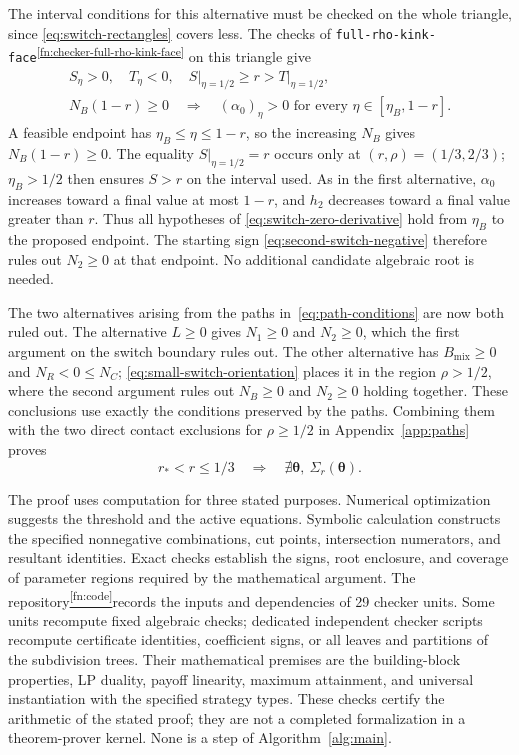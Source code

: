 \documentclass[11pt]{article}
\theoremstyle{remark}
\theoremstyle{plain}
\newcommand{\codefootref}{\hyperref[fn:code]{\textsuperscript{\ref*{fn:code}}}}
\begin{document}
The interval conditions for this alternative must be checked on
the whole triangle, since \eqref{eq:switch-rectangles} covers less.
The checks of \nolinkurl{full-rho-kink-face}\textsuperscript{\ref{fn:checker-full-rho-kink-face}} on this triangle give
\begin{equation}
 \begin{gathered}
 S_\eta>0,\quad T_\eta<0,\quad \left.S\right|_{\eta=1/2}\ge r>\left.T\right|_{\eta=1/2},\\
 N_B(1-r)\ge0\quad\Longrightarrow\quad
 (\alpha_0)_\eta>0\text{ for every }\eta\in[\eta_B,1-r].
 \end{gathered}
 \label{eq:second-switch-interval-signs}
\end{equation}
A feasible endpoint has $\eta_B\le\eta\le1-r$, so the increasing
$N_B$ gives $N_B(1-r)\ge0$.
The equality $\left.S\right|_{\eta=1/2}=r$ occurs only at $(r,\rho)=(1/3,2/3)$;
$\eta_B>1/2$ then ensures $S>r$ on the interval used.
As in the first alternative, $\alpha_0$ increases toward a final value
at most $1-r$, and $h_2$ decreases toward a final value greater
than $r$. Thus all hypotheses of \eqref{eq:switch-zero-derivative}
hold from $\eta_B$ to the proposed endpoint. The starting sign
\eqref{eq:second-switch-negative} therefore rules out $N_2\ge0$
at that endpoint. No additional candidate algebraic root is needed.

The two alternatives arising from the paths in~\eqref{eq:path-conditions}
are now both ruled out. The alternative $L\ge0$ gives $N_1\ge0$
and $N_2\ge0$, which the first argument on the switch boundary
rules out. The other
alternative has $B_{\mathrm{mix}}\ge0$ and $N_R<0\le N_C$;
\eqref{eq:small-switch-orientation} places it in the region
$\rho>1/2$, where the second argument rules out $N_B\ge0$ and
$N_2\ge0$ holding together.
These conclusions use exactly the conditions preserved by the paths.
Combining them with the two direct contact exclusions for
$\rho\ge1/2$ in Appendix~\ref{app:paths} proves
\begin{equation}
 r_*<r\le1/3\quad\Longrightarrow\quad
 \nexists\boldsymbol\theta,\ \Sigma_r(\boldsymbol\theta).
 \label{eq:global-exclusion}
\end{equation}

The proof uses computation for three stated purposes. Numerical
optimization suggests the threshold and the active equations.
Symbolic calculation constructs the specified nonnegative combinations,
cut points, intersection numerators, and resultant identities.
Exact checks establish the signs, root enclosure, and coverage of
parameter regions required by the mathematical argument.
The repository\codefootref records the inputs and dependencies of
29 checker units. Some units recompute fixed algebraic checks;
dedicated independent checker scripts recompute certificate identities,
coefficient signs, or all leaves and partitions of the subdivision
trees.
Their mathematical premises are the building-block properties,
LP duality, payoff linearity, maximum attainment, and universal
instantiation with the specified strategy types. These checks certify
the arithmetic of the stated proof; they are not a completed
formalization in a theorem-prover kernel. None is a step of
Algorithm~\ref{alg:main}.
\end{document}
